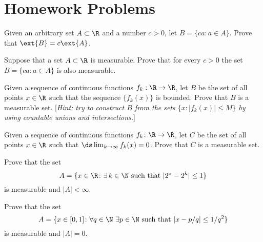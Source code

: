 \newpage
\section{Homework Problems}

\begin{hw} \label{hw:1}
Given an arbitrary set $A \subset \R$ and a number $c>0$, let $B = \{ ca \colon a \in A \}$. Prove that $\ext{B} = c \ext{A}$. \\
\end{hw}


\begin{hw} \label{hw:2}
Suppose that a set $A \subset \R$ is measurable. Prove that for every $c>0$ the set $B = \{ ca \colon a \in A \}$ is also measurable. \\
\end{hw}


\begin{hw} \label{hw:3}
Given a sequence of continuous functions $f_k: \R \to \R$, let $B$ be the set of all points $x \in \R$ such that the sequence $\{ f_k(x) \}$ is bounded. Prove that $B$ is a measurable set. [\emph{Hint: try to construct $B$ from the sets $\{x \colon |f_k(x)| \leq M\}$ by using countable unions and intersections.}] \\
\end{hw}


\begin{hw} \label{hw:4}
Given a sequence of continuous functions $f_k \colon \R \to \R$, let $C$ be the set of all points $x \in \R$ such that $\ds \lim_{k \to \infty} f_k(x)= 0$. Prove that $C$ is a measurable set. \\
\end{hw}


\begin{hw} \label{hw:5}
Prove that the set
        \[
        A = \{ x \in \R \colon \exists \, k \in \N \text{ such that } |2^x-2^k| \leq 1 \}
        \]
is measurable and $|A|<\infty$. \\
\end{hw}


\begin{hw} \label{hw:6}
Prove that the set
        \[
        A = \{ x \in [0, 1] \colon \forall q \in \N \ \exists p \in \N \text{ such that } |x-p/q| \leq 1/q^2 \}
        \]
is measurable and $|A|=0$. \\
\end{hw}


